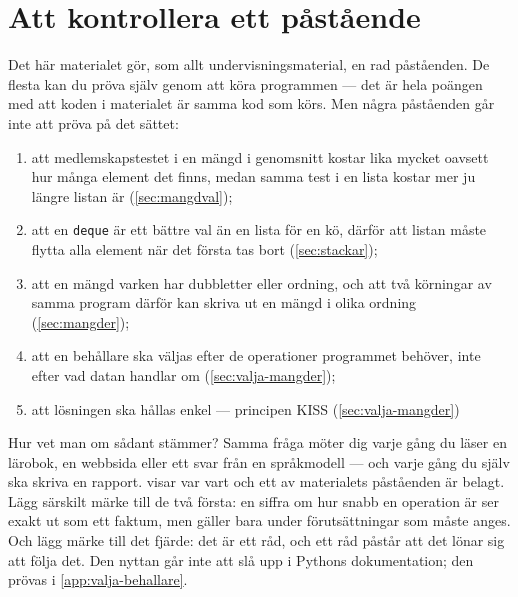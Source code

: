 \chapter{Att kontrollera ett påstående}
\label{app:verifiera-mangder}

Det här materialet gör, som allt undervisningsmaterial, en rad
påståenden.  De flesta kan du pröva själv genom att köra programmen ---
det är hela poängen med att koden i materialet är samma kod som körs.  Men
några påståenden går inte att pröva på det sättet:
\begin{enumerate}
  \item att medlemskapstestet i en mängd i genomsnitt kostar lika mycket
    oavsett hur många element det finns, medan samma test i en lista
    kostar mer ju längre listan är (\cref{sec:mangdval});
  \item att en \texttt{deque} är ett bättre val än en lista
    för en kö, därför att listan måste flytta alla element när det
    första tas bort (\cref{sec:stackar});
  \item att en mängd varken har dubbletter eller ordning, och att två
    körningar av samma program därför kan skriva ut en mängd i olika
    ordning (\cref{sec:mangder});
  \item att en behållare ska väljas efter de operationer programmet
    behöver, inte efter vad datan handlar om (\cref{sec:valja-mangder});
  \item att lösningen ska hållas enkel --- principen
    \foreignlanguage{english}{KISS} (\cref{sec:valja-mangder})%
\end{enumerate}
Hur vet man om sådant stämmer?  Samma fråga möter dig varje gång du läser
en lärobok, en webbsida eller ett svar från en språkmodell --- och varje
gång du själv ska skriva en rapport.
 visar var vart och ett av materialets
påståenden är belagt.  Lägg särskilt märke till de två första: en siffra
om hur snabb en operation är ser exakt ut som ett faktum, men gäller bara
under förutsättningar som måste anges.  Och lägg märke till det fjärde:
det är ett råd, och ett råd påstår att det lönar sig att följa det.  Den
nyttan går inte att slå upp i Pythons dokumentation; den prövas i
\cref{app:valja-behallare}.

